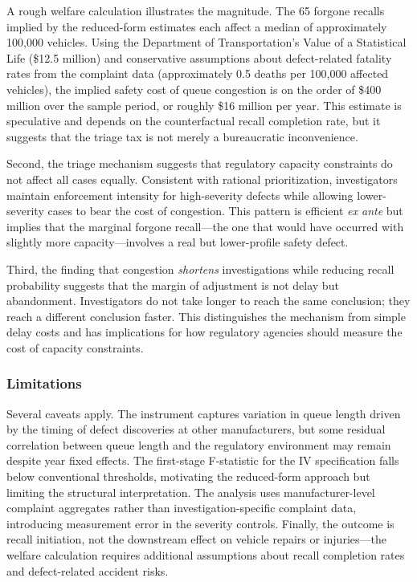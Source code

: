 \documentclass[12pt]{article}
\begin{document}
A rough welfare calculation illustrates the magnitude. The 65 forgone recalls implied by the reduced-form estimates each affect a median of approximately 100,000 vehicles. Using the Department of Transportation's Value of a Statistical Life (\$12.5 million) and conservative assumptions about defect-related fatality rates from the complaint data (approximately 0.5 deaths per 100,000 affected vehicles), the implied safety cost of queue congestion is on the order of \$400 million over the sample period, or roughly \$16 million per year. This estimate is speculative and depends on the counterfactual recall completion rate, but it suggests that the triage tax is not merely a bureaucratic inconvenience.

Second, the triage mechanism suggests that regulatory capacity constraints do not affect all cases equally. Consistent with rational prioritization, investigators maintain enforcement intensity for high-severity defects while allowing lower-severity cases to bear the cost of congestion. This pattern is efficient \textit{ex ante} but implies that the marginal forgone recall---the one that would have occurred with slightly more capacity---involves a real but lower-profile safety defect.

Third, the finding that congestion \textit{shortens} investigations while reducing recall probability suggests that the margin of adjustment is not delay but abandonment. Investigators do not take longer to reach the same conclusion; they reach a different conclusion faster. This distinguishes the mechanism from simple delay costs and has implications for how regulatory agencies should measure the cost of capacity constraints.

\subsubsection*{Limitations} Several caveats apply. The instrument captures variation in queue length driven by the timing of defect discoveries at other manufacturers, but some residual correlation between queue length and the regulatory environment may remain despite year fixed effects. The first-stage F-statistic for the IV specification falls below conventional thresholds, motivating the reduced-form approach but limiting the structural interpretation. The analysis uses manufacturer-level complaint aggregates rather than investigation-specific complaint data, introducing measurement error in the severity controls. Finally, the outcome is recall initiation, not the downstream effect on vehicle repairs or injuries---the welfare calculation requires additional assumptions about recall completion rates and defect-related accident risks.
\end{document}
